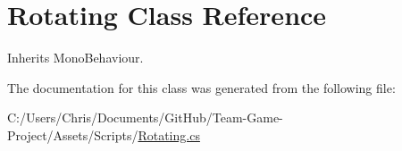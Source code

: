 \hypertarget{class_rotating}{}\section{Rotating Class Reference}
\label{class_rotating}


Inherits Mono\+Behaviour.



The documentation for this class was generated from the following file\+:\begin{DoxyCompactItemize}
\item 
C\+:/\+Users/\+Chris/\+Documents/\+Git\+Hub/\+Team-\/\+Game-\/\+Project/\+Assets/\+Scripts/\hyperlink{_rotating_8cs}{Rotating.\+cs}\end{DoxyCompactItemize}
